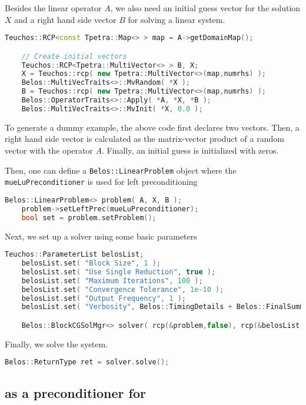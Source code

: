 Besides the linear operator $A$, we also need an initial guess vector for the
solution $X$ and a right hand side vector $B$ for solving a linear system.
\begin{lstlisting}[language=C++]
    Teuchos::RCP<const Tpetra::Map<> > map = A->getDomainMap();

    // Create initial vectors
    Teuchos::RCP<Tpetra::MultiVector<> > B, X;
    X = Teuchos::rcp( new Tpetra::MultiVector<>(map,numrhs) );
    Belos::MultiVecTraits<>::MvRandom( *X );
    B = Teuchos::rcp( new Tpetra::MultiVector<>(map,numrhs) );
    Belos::OperatorTraits<>::Apply( *A, *X, *B );
    Belos::MultiVecTraits<>::MvInit( *X, 0.0 );
\end{lstlisting}
To generate a dummy example, the above code first declares two vectors. Then, a
right hand side vector is calculated as the matrix-vector product of a random vector
with the operator $A$. Finally, an initial guess is initialized with zeros.

Then, one can define a \texttt{Belos::LinearProblem} object where the
\texttt{mueLuPreconditioner} is used for left preconditioning
\begin{lstlisting}[language=C++]
    Belos::LinearProblem<> problem( A, X, B );
    problem->setLeftPrec(mueLuPreconditioner);
    bool set = problem.setProblem();
\end{lstlisting}

Next, we set up a \belos{} solver using some basic parameters
\begin{lstlisting}[language=C++]
    Teuchos::ParameterList belosList;
    belosList.set( "Block Size", 1 );
    belosList.set( "Use Single Reduction", true );
    belosList.set( "Maximum Iterations", 100 );
    belosList.set( "Convergence Tolerance", 1e-10 );
    belosList.set( "Output Frequency", 1 );
    belosList.set( "Verbosity", Belos::TimingDetails + Belos::FinalSummary );

    Belos::BlockCGSolMgr<> solver( rcp(&problem,false), rcp(&belosList,false) );
\end{lstlisting}

Finally, we solve the system.
\begin{lstlisting}[language=C++]
    Belos::ReturnType ret = solver.solve();
\end{lstlisting}

\subsection{\muelu{} as a preconditioner for \aztecoo}

